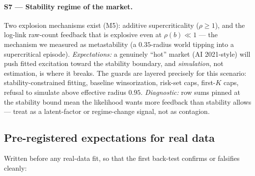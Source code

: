 \paragraph{S7 --- Stability regime of the market.}
Two explosion mechanisms exist (M5): additive supercriticality
($\rho\ge1$), and the log-link raw-count feedback that is explosive even at
$\rho(b)\ll1$ --- the mechanism we measured as metastability (a $0.35$-radius
world tipping into a supercritical episode). \emph{Expectations:} a genuinely
``hot'' market (AI 2021-style) will push fitted excitation toward the
stability boundary, and \emph{simulation}, not estimation, is where it breaks.
The guards are layered precisely for this scenario: stability-constrained
fitting, baseline winsorization, risk-set caps, first-$K$ caps, refusal to
simulate above effective radius $0.95$. \emph{Diagnostic:} row sums pinned at
the stability bound mean the likelihood wants more feedback than stability
allows --- treat as a latent-factor or regime-change signal, not as contagion.

\subsection{Pre-registered expectations for real data}
\label{sec:design_prereg}

Written before any real-data fit, so that the first back-test confirms or
falsifies cleanly:

